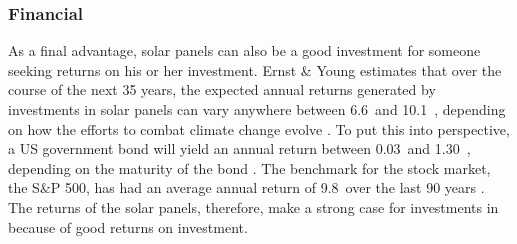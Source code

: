  \subsubsection{Financial}
 As a final advantage, solar panels can also be a good investment for someone seeking returns on his or her investment. Ernst \& Young estimates that over the course of the next 35 years, the expected annual returns generated by investments in solar panels can vary anywhere between 6.6\  and 10.1\ , depending on how the efforts to combat climate change evolve \cite{mercer}. To put this into perspective, a US government bond will yield an annual return between 0.03\  and 1.30\ , depending on the maturity of the bond \cite{bonds}. The benchmark for the stock market, the S\&P 500, has had an average annual return of 9.8\  over the last 90 years \cite{stocks}. The returns of the solar panels, therefore, make a strong case for investments in because of good returns on investment.
